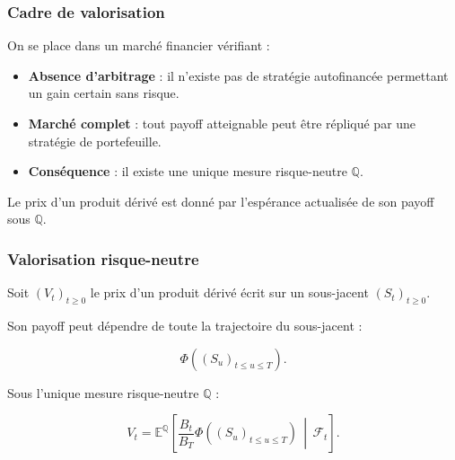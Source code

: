 \documentclass[aspectratio=169,11pt]{beamer}
\begin{document}
\begin{frame}
    \frametitle{Cadre de valorisation}

    On se place dans un marché financier vérifiant :

    \vspace{0.4cm}

    \begin{itemize}
        \item \textbf{Absence d'arbitrage} :
        il n'existe pas de stratégie autofinancée permettant un gain certain sans risque.

        \vspace{0.25cm}

        \item \textbf{Marché complet} :
        tout payoff atteignable peut être répliqué par une stratégie de portefeuille.

        \vspace{0.25cm}

        \item \textbf{Conséquence} :
        il existe une unique mesure risque-neutre $\mathbb{Q}$.
    \end{itemize}

    \vspace{0.4cm}

    Le prix d'un produit dérivé est donné par l'espérance actualisée
    de son payoff sous $\mathbb{Q}$.

\end{frame}

\begin{frame}
    \frametitle{Valorisation risque-neutre}

    Soit $(V_t)_{t\geq 0}$ le prix d'un produit dérivé
    écrit sur un sous-jacent $(S_t)_{t\geq 0}$.

    \vspace{0.3cm}

    Son payoff peut dépendre de toute la trajectoire du sous-jacent :

    \[
        \Phi\left((S_u)_{t\leq u\leq T}\right).
    \]

    Sous l'unique mesure risque-neutre $\mathbb{Q}$ :

    \[
        \boxed{
        V_t
        =
        \mathbb{E}^{\mathbb{Q}}
        \left[
            \frac{B_t}{B_T}
            \Phi\left((S_u)_{t\leq u\leq T}\right)
            \,\middle|\,
            \mathcal{F}_t
        \right].
        }
    \]

\end{frame}
\end{document}
